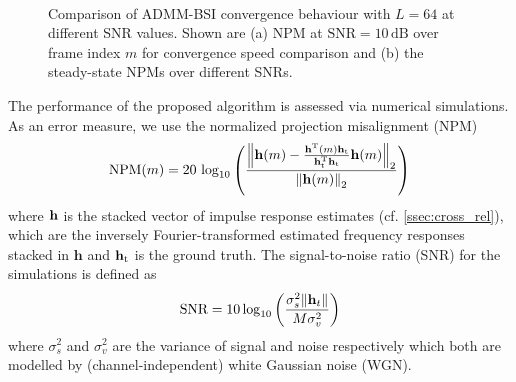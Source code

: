 \documentclass{article}
\newcommand{\h}{\mtxb{h}}
\newcommand{\hf}{{\bm{h}}}
\begin{document}
\begin{figure}[t]
    \centering
    \\
    \vspace*{-0.3cm}
    \vspace*{-0.2cm}
    \caption{Comparison of ADMM-BSI convergence behaviour with \(L\!=\!64\) at different SNR values. Shown are (a) NPM at \(\text{SNR}=10\,\text{dB}\) over frame index \(m\) for convergence speed comparison and (b) the steady-state NPMs over different SNRs.}
    \label{fig:perf_eval:NPM_over_time_exp1}
\end{figure}

The performance of the proposed algorithm is assessed via numerical simulations.
As an error measure, we use the normalized projection misalignment (NPM) \cite{huangClassFrequencydomainAdaptive2003}
\begin{equation}
    \text{NPM}(m) = 20\,\log_{10} \left(\frac{\left\| \h(m) - \frac{\h^\T (m) \h_{\text{t}}}{\h_{\text{t}}^\T \h_{\text{t}}}\h(m) \right\|_2}{\left\|\h(m)\right\|_2} \right)
\end{equation}
where \(\h\) is the stacked vector of impulse response estimates (cf. \autoref{ssec:cross_rel}), which are the inversely Fourier-transformed estimated frequency responses stacked in \(\hf\) and \(\h_{\text{t}}\) is the ground truth. The signal-to-noise ratio (SNR) for the simulations is defined as 
\begin{equation}
    \text{SNR} = 10 \log_{10} \left(\frac{\sigma_s^2 \| \h_t \|}{M \sigma_v^2} \right)
\end{equation}
where \(\sigma_s^2\) and \(\sigma_v^2\) are the variance of signal and noise respectively which both are modelled by (channel-independent) white Gaussian noise (WGN).
\end{document}
